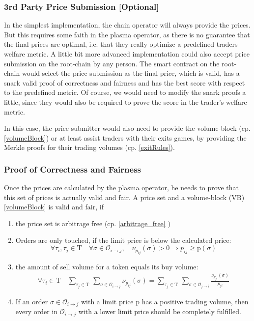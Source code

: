 \documentclass[11pt,parskip=full]{scrartcl}%
\newcommand{\Tau}{\mathrm{T}}
\def\pO{\mathcal{O}}
\def\ra{\rightarrow}
\begin{document}
\subsubsection*{3rd Party Price Submission [Optional]}
\label{publicPrices}
In the simplest implementation, the chain operator will always provide the prices. But this requires some faith in the plasma operator, as there is no guarantee that the final prices are optimal, i.e. that they really optimize a predefined traders welfare metric.
A little bit more advanced implementation could also accept price submission on the root-chain by any person. 
The smart contract on the root-chain would select the price submission as the final price, which is valid, has a snark valid proof of correctness and fairness and has the best score with respect to the predefined metric. Of course, we would need to modify the snark proofs a little, since they would also be required to prove the score in the trader's welfare metric. 

In this case, the price submitter would also need to provide the volume-block (cp. \ref{volumeBlock}) or at least assist traders with their exits games, by providing the Merkle proofs for their trading volumes (cp. \ref{exitRules}). 

\subsubsection{Proof of Correctness and Fairness}
\label{proofprices}
Once the prices are calculated by the plasma operator, he needs to prove that this set of prices is actually valid and fair. A price set and a volume-block (VB) \ref{volumeBlock} is valid and fair, if

\begin{enumerate}

\item the price set is arbitrage free (cp. \ref{arbitrage_free} )
\item Orders are only touched, if the limit price is below the calculated price:\newline
\begin{equation} \forall \tau_i ,\tau_j \in \Tau \quad \forall \sigma \in \pO_{i\ra j}, \quad \nu_{p_{ij}}(\sigma)>0 \Rightarrow p_{ij}\geq \text{p}(\sigma)
\label{limitprice_sat}
\end{equation}
\item the amount of sell volume for a token equals its buy volume: 
\begin{equation}
\begin{split}
\forall \tau_i \in \Tau \quad \sum_{\tau_j\in \Tau} \,
\sum_{ \sigma\in \pO_{i \rightarrow j}} \nu_{p_{ij}}(\sigma) = \sum_{\tau_j\in \Tau} \, \sum_{\sigma\in \pO_{j\rightarrow i}} \frac{\nu_{p_{ji}}(\sigma)}{p_{ji}}
\label{volume_balance}
\end{split}
\end{equation}
\item If an order $\sigma \in \pO_{i\rightarrow j}$ with a limit price p has a positive trading volume, then every order in $\pO_{i\rightarrow j}$ with a lower limit price should be completely fulfilled. 
\end{enumerate}
\end{document}
